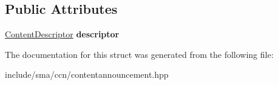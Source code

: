 \subsection*{Public Attributes}
\begin{DoxyCompactItemize}
\item 
\hypertarget{structsma_1_1ContentAnnouncement_a4c5898183fab23c5c7964f18377da974}{\hyperlink{structsma_1_1ContentDescriptor}{Content\-Descriptor} {\bfseries descriptor}}\label{structsma_1_1ContentAnnouncement_a4c5898183fab23c5c7964f18377da974}

\end{DoxyCompactItemize}


The documentation for this struct was generated from the following file\-:\begin{DoxyCompactItemize}
\item 
include/sma/ccn/contentannouncement.\-hpp\end{DoxyCompactItemize}
